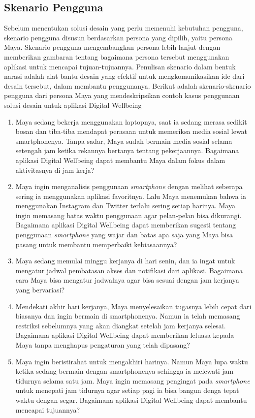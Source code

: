 \subsection{Skenario Pengguna}
Sebelum menentukan solusi desain yang perlu memenuhi kebutuhan pengguna, skenario pengguna disusun berdasarkan persona yang dipilih, yaitu persona Maya. Skenario pengguna mengembangkan persona lebih lanjut dengan memberikan gambaran tentang bagaimana persona tersebut menggunakan aplikasi untuk mencapai tujuan-tujuannya. Penulisan skenario dalam bentuk narasi adalah alat bantu desain yang efektif untuk mengkomunikasikan ide dari desain tersebut, dalam membantu penggunanya. \parencite{cooper2014face} Berikut adalah skenario-skenario pengguna dari persona Maya yang mendeskripsikan contoh kasus penggunaan solusi desain untuk aplikasi Digital Wellbeing
\begin{enumerate}
  \item Maya sedang bekerja menggunakan laptopnya, saat ia sedang merasa sedikit bosan dan tiba-tiba mendapat perasaan untuk memeriksa media sosial lewat smartphonenya. Tanpa sadar, Maya sudah bermain media sosial selama setengah jam ketika rekannya bertanya tentang pekerjaannya. Bagaimana aplikasi Digital Wellbeing dapat membantu Maya dalam fokus dalam aktivitasnya di jam kerja?
  \item Maya ingin menganalisis penggunaan \textit{smartphone} dengan melihat seberapa sering ia menggunakan aplikasi favoritnya. Lalu Maya menemukan bahwa ia menggunakan Instagram dan Twitter terlalu sering setiap harinya. Maya ingin memasang batas waktu penggunaan agar pelan-pelan bisa dikurangi. Bagaimana aplikasi Digital Wellbeing dapat memberikan sugesti  tentang penggunaan \textit{smartphone} yang wajar dan batas apa saja yang Maya bisa pasang untuk membantu memperbaiki kebiasaannya?
  \item Maya sedang memulai minggu kerjanya di hari senin, dan ia ingat untuk mengatur jadwal pembatasan akses dan notifikasi dari aplikasi. Bagaimana cara Maya bisa mengatur jadwalnya agar bisa sesuai dengan jam kerjanya yang bervariasi?
  \item Mendekati akhir hari kerjanya, Maya menyelesaikan tugasnya lebih cepat dari biasanya dan ingin bermain di smartphonenya. Namun ia telah memasang restriksi sebelumnya yang akan diangkat setelah jam kerjanya selesai. Bagaimana aplikasi Digital Wellbeing dapat memberikan leluasa kepada Maya tanpa menghapus pengaturan yang telah dipasang?
  \item Maya ingin beristirahat untuk mengakhiri harinya. Namun Maya lupa waktu ketika sedang bermain dengan smartphonenya sehingga ia melewati jam tidurnya selama satu jam. Maya ingin memasang pengingat pada \textit{smartphone} untuk menepati jam tidurnya agar setiap pagi ia bisa bangun denga tepat waktu dengan segar. Bagaimana aplikasi Digital Wellbeing dapat membantu mencapai tujuannya?
\end{enumerate}


